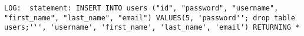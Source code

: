\begin{lstlisting}[caption={Log of Express injection request},breaklines=true,label={lst:expressInjectionLog}]
    LOG:  statement: INSERT INTO users ("id", "password", "username", "first_name", "last_name", "email") VALUES(5, 'password''; drop table users;''', 'username', 'first_name', 'last_name', 'email') RETURNING *
\end{lstlisting}
